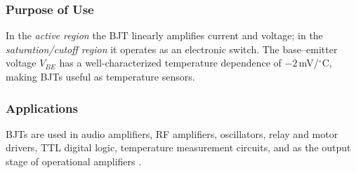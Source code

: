 \subsubsection*{Purpose of Use}
In the \textit{active region} the BJT linearly amplifies current and voltage; in the
\textit{saturation/cutoff region} it operates as an electronic switch. The base--emitter
voltage $V_{BE}$ has a well-characterized temperature dependence of $-2$\,mV/$^\circ$C,
making BJTs useful as temperature sensors.

\subsubsection*{Applications}
BJTs are used in audio amplifiers, RF amplifiers, oscillators, relay and motor drivers,
TTL digital logic, temperature measurement circuits, and as the output stage of
operational amplifiers \cite{razavi2013}.
